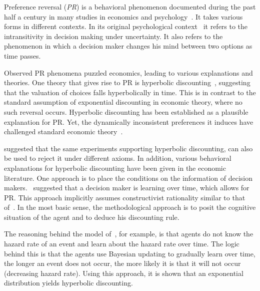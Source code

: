 \documentclass[11pt]{article}
\newcommand{\ie}{{\it i.e.}\ }
\numberwithin{equation}{section}
\begin{document}
Preference reversal (\textit{PR}) is a behavioral phenomenon documented during the past half a century in many studies in economics and psychology~\citep{lichtenstein1971reversals,lindman1971inconsistent,grether1979economic,loomes1983rationale,tversky1990causes,ainslie1992picoeconomics,laibson1997golden}. It takes various forms in different contexts. In its original psychological context~\citep{tversky1969intransitivity,lichtenstein1971reversals} it refers to the intransitivity in decision making under uncertainty. It also refers to the phenomenon in which a decision maker changes his mind between two options as time passes.

Observed PR phenomena puzzled economics, leading to various explanations and theories. One theory that gives rise to PR is hyperbolic discounting~\citep{ainslie1992picoeconomics,sozou1998hyperbolic,laibson1997golden}, suggesting that the valuation of choices falls hyperbolically in time. 
This is in contrast to the standard assumption of exponential discounting in economic theory, where no such reversal occurs.
Hyperbolic discounting has been established as a plausible explanation for PR. 
Yet, the dynamically inconsistent preferences it induces have challenged standard economic theory~\citep{laibson1997golden,starmer2000developments,thaler2016behavioral}. 

\citet{rubinstein2003economics} suggested that the same experiments supporting hyperbolic discounting, can also be used to reject it under different axioms. In addition, various behavioral explanations for hyperbolic discounting have been given in the economic literature. One approach is to place the conditions on the information of decision makers.~\citet{sozou1998hyperbolic,dasgupta2005uncertainty} suggested that a decision maker is learning over time, which allows for PR. This approach implicitly assumes constructivist rationality similar to that of~\citet{smith2003constructivist}. In the most basic sense, the methodological approach is to posit the cognitive situation of the agent and to deduce his discounting rule.

The reasoning behind the model of~\citet{sozou1998hyperbolic}, for example, is that agents do not know the hazard rate of an event and learn about the hazard rate over time. The logic behind this is that the agents use Bayesian updating to gradually learn over time, the longer an event does not occur, the more likely it is that it will not occur (decreasing hazard rate). Using this approach, it is shown that an exponential distribution yields hyperbolic discounting.
\end{document}
